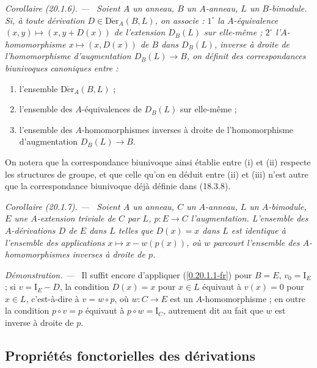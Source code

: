\documentclass[10pt,oneside]{book}
\makeatletter
\newcommand{\sref}[1]{(\ref{#1})}
\newcommand{\setmanualcurrentlabel}[1]{\def\@currentlabel{#1}}
\newenvironment{corollary}[1][]{%
  \setmanualcurrentlabel{#1}\par\medskip\noindent\itshape Corollaire (#1). ---\ }{\par}
\newenvironment{proof}{%
  \par\medskip\noindent\textit{Démonstration. ---\ }}{\par}
\makeatother
\begin{document}
\begin{corollary}[20.1.6]
\label{0.20.1.6-fr}
Soient $A$ un anneau, $B$ un $A$-anneau, $L$ un $B$-bimodule. Si, à toute
dérivation $D\in\operatorname{D\acute{e}r}_A(B,L)$, on associe : $1^\circ$ la
$A$-équivalence $(x,y)\mapsto(x,y+D(x))$ de l'extension $D_B(L)$ sur
elle-même ; $2^\circ$ l'$A$-homomorphisme $x\mapsto(x,D(x))$ de $B$ dans
$D_B(L)$, inverse à droite de l'homomorphisme d'augmentation $D_B(L)\to B$,
on définit des correspondances biunivoques canoniques entre :
\begin{enumerate}
  \item[\rm(i)] l'ensemble $\operatorname{D\acute{e}r}_A(B,L)$ ;
  \item[\rm(ii)] l'ensemble des $A$-équivalences de $D_B(L)$ sur elle-même ;
  \item[\rm(iii)] l'ensemble des $A$-homomorphismes inverses à droite de
  l'homomorphisme d'augmentation $D_B(L)\to B$.
\end{enumerate}
\end{corollary}

On notera que la correspondance biunivoque ainsi établie entre (i) et (ii)
respecte les structures de groupe, et que celle qu'on en déduit entre (ii) et
(iii) n'est autre que la correspondance biunivoque déjà définie dans (18.3.8).

\begin{corollary}[20.1.7]
\label{0.20.1.7-fr}
Soient $A$ un anneau, $C$ un $A$-anneau, $L$ un $A$-bimodule, $E$ une
$A$-extension triviale de $C$ par $L$, $p:E\to C$ l'augmentation. L'ensemble
des $A$-dérivations $D$ de $E$ dans $L$ telles que $D(x)=x$ dans $L$ est
identique à l'ensemble des applications $x\mapsto x-w(p(x))$, où $w$
parcourt l'ensemble des $A$-homomorphismes inverses à droite de $p$.
\end{corollary}

\begin{proof}
Il suffit encore d'appliquer \sref{0.20.1.1-fr} pour $B=E$,
$v_0=\mathrm{I}_E$ ; si $v=\mathrm{I}_E-D$, la condition $D(x)=x$ pour
$x\in L$ équivaut à $v(x)=0$ pour $x\in L$, c'est-à-dire à $v=w\circ p$,
où $w:C\to E$ est un $A$-homomorphisme ; en outre la condition
$p\circ v=p$ équivaut à $p\circ w=\mathrm{I}_C$, autrement dit au fait que
$w$ est inverse à droite de $p$.
\end{proof}

\subsection{Propriétés fonctorielles des dérivations}
\label{subsection:0.20.2-fr}
\end{document}
